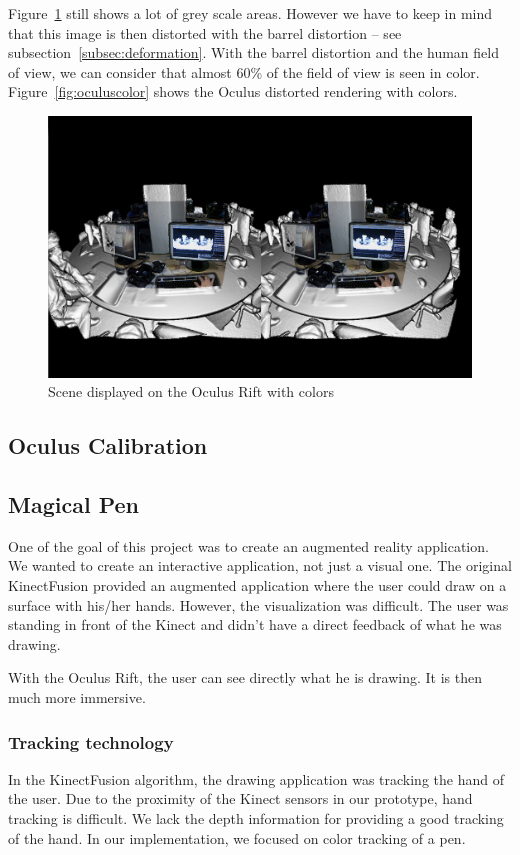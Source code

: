 \documentclass[12pt]{article}
\begin{document}
Figure~\ref{fig:colorex} still shows a lot of grey scale areas. However we have to keep in mind that this image is then distorted with the barrel distortion -- see subsection~\ref{subsec:deformation}. With the barrel distortion and the human field of view, we can consider that almost 60\% of the field of view is seen in color. Figure~\ref{fig:oculuscolor} shows the Oculus distorted rendering with colors.

\begin{figure}[!h]
  \centering
  \includegraphics[scale=0.3]{ColorRift.png}
  \caption{\label{fig:colorex} Scene displayed on the Oculus Rift with colors}
\end{figure}

\subsection{Oculus Calibration}

\subsection{Magical Pen}
One of the goal of this project was to create an augmented reality application. We wanted to create an interactive application, not just a visual one. The original KinectFusion provided an augmented application where the user could draw on a surface with his/her hands. However, the visualization was difficult. The user was standing in front of the Kinect and didn't have a direct feedback of what he was drawing.

With the Oculus Rift, the user can see directly what he is drawing. It is then much more immersive.

\subsubsection{Tracking technology}
In the KinectFusion algorithm, the drawing application was tracking the hand of the user. Due to the proximity of the Kinect sensors in our prototype, hand tracking is difficult. We lack the depth information for providing a good tracking of the hand. In our implementation, we focused on color tracking of a pen.
\end{document}
